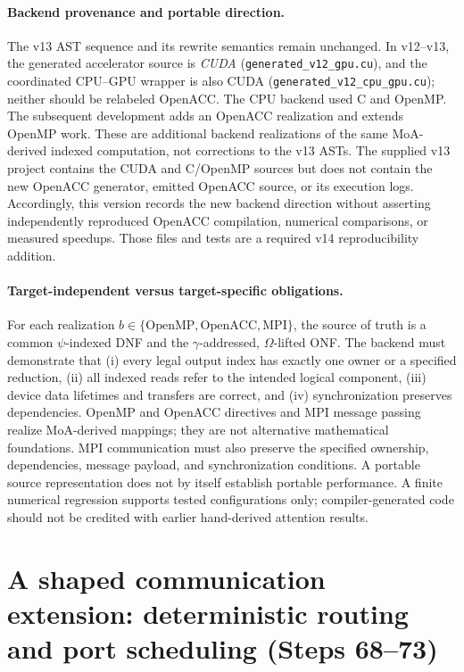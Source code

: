 \documentclass[11pt]{article}
\begin{document}
\paragraph{Backend provenance and portable direction.}
The v13 AST sequence and its rewrite semantics remain unchanged. In v12--v13, the generated accelerator source is \emph{CUDA} (\texttt{generated\_v12\_gpu.cu}), and the coordinated CPU--GPU wrapper is also CUDA (\texttt{generated\_v12\_cpu\_gpu.cu}); neither should be relabeled OpenACC. The CPU backend used C and OpenMP. The subsequent development adds an OpenACC realization and extends OpenMP work. These are additional backend realizations of the same MoA-derived indexed computation, not corrections to the v13 ASTs. The supplied v13 project contains the CUDA and C/OpenMP sources but does not contain the new OpenACC generator, emitted OpenACC source, or its execution logs. Accordingly, this version records the new backend direction without asserting independently reproduced OpenACC compilation, numerical comparisons, or measured speedups. Those files and tests are a required v14 reproducibility addition.

\paragraph{Target-independent versus target-specific obligations.}
For each realization $b\in\{\mathrm{OpenMP},\mathrm{OpenACC},\mathrm{MPI}\}$, the source of truth is a common $\psi$-indexed DNF and the $\gamma$-addressed, $\Omega$-lifted ONF. The backend must demonstrate that (i) every legal output index has exactly one owner or a specified reduction, (ii) all indexed reads refer to the intended logical component, (iii) device data lifetimes and transfers are correct, and (iv) synchronization preserves dependencies. OpenMP and OpenACC directives and MPI message passing realize MoA-derived mappings; they are not alternative mathematical foundations. MPI communication must also preserve the specified ownership, dependencies, message payload, and synchronization conditions. A portable source representation does not by itself establish portable performance. A finite numerical regression supports tested configurations only; compiler-generated code should not be credited with earlier hand-derived attention results.

\section{A shaped communication extension: deterministic routing and port scheduling (Steps 68--73)}
\label{sec:v14communication}
\end{document}
